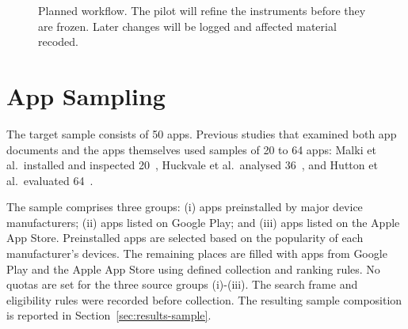 \begin{figure}[t]
\centering
{}
\caption[Planned workflow]{Planned workflow. The pilot will refine the instruments before they
		are frozen. Later changes will be logged and affected material recoded.}
\label{fig:pipeline}
\end{figure}

\section{App Sampling}
\label{sec:app-sampling}
The target sample consists of 50 apps. Previous studies that examined both
app documents and the apps themselves used samples of 20 to 64 apps:
Malki et al.\ installed and inspected 20~\parencite{malki2024exploring},
Huckvale et al.\ analysed 36~\parencite{huckvale2019assessment}, and
Hutton et al.\ evaluated 64~\parencite{hutton2018assessing}.

The sample comprises three groups: \textcolor{accent}{(i)} apps preinstalled
by major device manufacturers; \textcolor{accent}{(ii)} apps listed on
Google Play; and \textcolor{accent}{(iii)} apps listed on the Apple App Store.
Preinstalled apps are selected based on the popularity of each manufacturer's
devices. The remaining places are filled with apps from Google Play and the
Apple App Store using defined collection and ranking rules. No quotas are set for the three source groups \textcolor{accent}{(i)}-\textcolor{accent}{(iii)}. The search frame and eligibility rules were
recorded before collection. The resulting sample composition is reported
in Section~\ref{sec:results-sample}.

